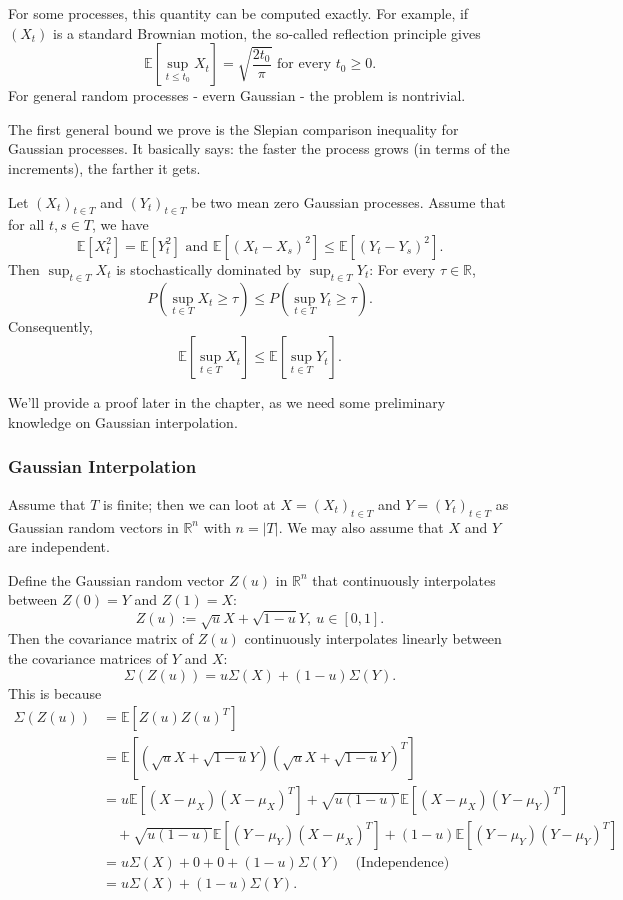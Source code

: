 For some processes, this quantity can be computed exactly. For example, if $(X_t)$ is a standard Brownian 
motion, the so-called reflection principle gives 
\[ \mathbb{E}\left[ \sup_{t \leq t_0} X_t \right] = \sqrt{\frac{2 t_0}{\pi}} \text{ for every } t_0 \geq 0. \]
For general random processes - evern Gaussian - the problem is nontrivial.

The first general bound we prove is the Slepian comparison inequality for Gaussian processes. It basically 
says: the faster the process grows (in terms of the increments), the farther it gets.

\begin{theorem}
\label{thm:7.2.2}
Let $(X_t)_{t \in T}$ and $(Y_t)_{t \in T}$ be two mean zero Gaussian processes. Assume that for all $t, s 
\in T$, we have 
\[ \mathbb{E}\left[ X_t^2 \right] = \mathbb{E}\left[ Y_t^2 \right] \text{ and } 
\mathbb{E}\left[ (X_t - X_s)^2 \right] \leq \mathbb{E}\left[ (Y_t - Y_s)^2 \right]. \]
Then $\sup_{t \in T}X_t$ is stochastically dominated by $\sup_{t \in T}Y_t$: For every $\tau \in \mathbb{R}$, 
\[ P \left( \sup_{t \in T} X_t \geq \tau \right) \leq P \left( \sup_{t \in T} Y_t \geq \tau \right). \]
Consequently, 
\[ \mathbb{E}\left[ \sup_{t \in T} X_t \right] \leq \mathbb{E}\left[ \sup_{t \in T} Y_t \right]. \]
\end{theorem}

We'll provide a proof later in the chapter, as we need some preliminary knowledge on Gaussian interpolation.


\subsubsection{Gaussian Interpolation}
Assume that $T$ is finite; then we can loot at $X = (X_t)_{t \in T}$ and $Y = (Y_t)_{t \in T}$ as Gaussian 
random vectors in $\mathbb{R}^n$ with $n = |T|$. We may also assume that $X$ and $Y$ are independent. 

Define the Gaussian random vector $Z(u)$ in $\mathbb{R}^n$ that continuously interpolates between $Z(0) = Y$ and 
$Z(1) = X$:
\[ Z(u) := \sqrt{u}X + \sqrt{1 - u}Y, \ u \in [0, 1]. \]
Then the covariance matrix of $Z(u)$ continuously interpolates linearly between the covariance matrices of 
$Y$ and $X$: 
\[ \Sigma(Z(u)) = u \Sigma(X) + (1 - u)\Sigma(Y). \]
This is because 
\begin{align*}
	\Sigma(Z(u)) 
	&= \mathbb{E}\left[ Z(u)Z(u)^T \right] \\
	&= \mathbb{E}\left[ (\sqrt{u}X + \sqrt{1 - u}Y)(\sqrt{u}X + \sqrt{1 - u}Y)^T \right] \\
	&= u \mathbb{E}\left[ (X - \mu_X)(X - \mu_X)^T \right] 
	+ \sqrt{u(1 - u)}\mathbb{E}\left[ (X - \mu_X)(Y - \mu_Y)^T \right] \\ 
	&\quad + \sqrt{u(1 - u)}\mathbb{E}\left[ (Y - \mu_Y)(X - \mu_X)^T \right] 
	+ (1 - u) \mathbb{E}\left[ (Y - \mu_Y)(Y - \mu_Y)^T \right] \\
	&= u \Sigma(X) + 0 + 0 + (1 - u)\Sigma(Y) \quad \text{(Independence)} \\
	&= u \Sigma(X) + (1 - u)\Sigma(Y).
\end{align*}

